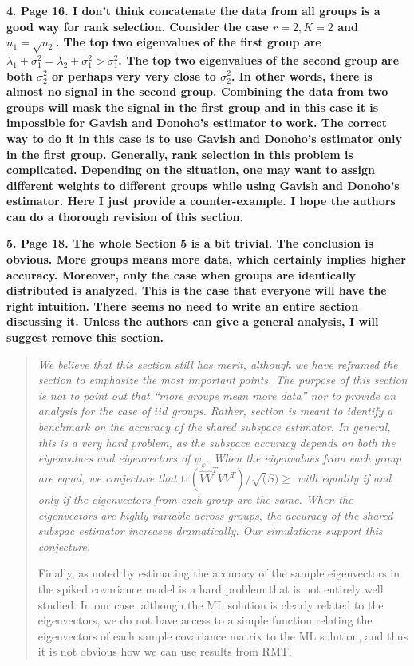 \documentclass{article}
\newcommand{\tr}{\text{tr}}
\newenvironment{resp}{\begin{quotation}\noindent\slshape}{\end{quotation}}
\begin{document}
\noindent \textbf{4. Page 16. I don’t think concatenate the data from all groups is a good way for rank selection. Consider the case $r = 2, K = 2$ and $n_1 =\sqrt{n_2}$. The top two eigenvalues of
the first group are $\lambda_1+\sigma_1^2 = \lambda_2+\sigma_1^2 > \sigma_1^2$.  The top two eigenvalues of the second group are both $\sigma_2^2$  or perhaps very very close to $\sigma_2^2$. In other words, there is almost no signal in the second group. Combining the data from two groups will mask the signal in the first group and in this case it is impossible for Gavish and Donoho’s estimator to work. The correct way to do it in this case is to use Gavish and Donoho’s estimator only in the first group. Generally, rank selection in this problem is complicated. Depending on the situation, one may want to assign different weights to different groups while using Gavish and Donoho’s estimator. Here I just provide a counter-example. I hope the authors can do a thorough revision of this section.}

\begin{resp}
\end{resp}

\noindent \textbf{5. Page 18. The whole Section 5 is a bit trivial. The conclusion is obvious. More groups means more data, which certainly implies higher accuracy. Moreover, only the case when groups are identically distributed is analyzed. This is the case that everyone will have the right intuition. There seems no need to write an entire section discussing it.  Unless the authors can give a general analysis, I will suggest remove this section.}

\begin{resp}
We believe that this section still has merit, although we have reframed the section to emphasize the most important points.  The purpose of this section is not to point out that ``more groups mean more data'' nor to provide an analysis for the case of $iid$ groups.  Rather, section is meant to identify a benchmark on the accuracy of the shared subspace estimator.  In general, this is a very hard problem, as the subspace accuracy depends on both the eigenvalues and eigenvectors of $\psi_k$.  When the eigenvalues from each group are equal, we conjecture that $\tr(\hat{V}\hat{V}^TVV^T)/\sqrt(S) \geq $ with equality if and only if the eigenvectors from each group are the same.  When the eigenvectors are highly variable across groups, the accuracy of the shared subspac estimator increases dramatically.  Our simulations support this conjecture. 


Finally, as noted by \citet{} estimating the accuracy of the sample eigenvectors in the spiked covariance model is a hard problem that is not entirely well studied.  In our case, although the ML solution is clearly related to the eigenvectors, we do not have access to a simple function relating the eigenvectors of each sample covariance matrix to the ML solution, and thus it is not obvious how we can use results from RMT. 
\end{resp}
\end{document}
